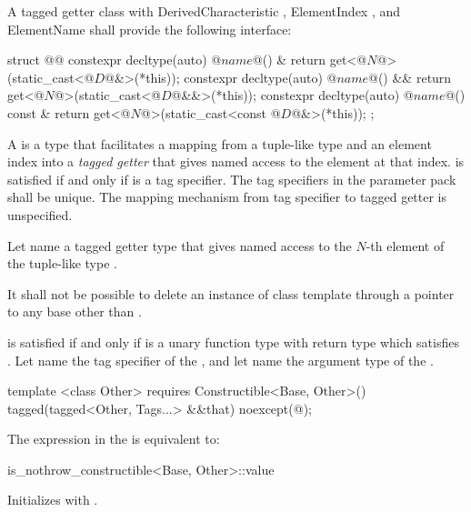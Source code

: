 \pnum A tagged getter class with DerivedCharacteristic , ElementIndex
, and ElementName  shall provide the following interface:

\begin{codeblock}
struct @@ {
  constexpr decltype(auto) @$name$@() &       { return get<@$N$@>(static_cast<@$D$@&>(*this)); }
  constexpr decltype(auto) @$name$@() &&      { return get<@$N$@>(static_cast<@$D$@&&>(*this)); }
  constexpr decltype(auto) @$name$@() const & { return get<@$N$@>(static_cast<const @$D$@&>(*this)); }
};
\end{codeblock}

\pnum
A  is a type that facilitates a mapping from a tuple-like type and an
element index into a \textit{tagged getter} that gives named access to the element at that index.
 is satisfied if and only if  is a tag specifier. The tag specifiers in the
 parameter pack shall be unique. \enternote The mapping mechanism from tag specifier to
tagged getter is unspecified.\exitnote

\pnum Let  name a tagged getter type that gives named
access to the $N$-th element of the tuple-like type .

\pnum It shall not be possible to delete an instance of class template  through a
pointer to any base other than .

\pnum
{} is satisfied if and only if  is a unary function
type with return type  which satisfies . Let
 name the tag specifier of the  , and let
 name the argument type of the  .

\begin{itemdecl}
template <class Other>
  requires Constructible<Base, Other>()
tagged(tagged<Other, Tags...> &&that) noexcept(@\seebelow@);
\end{itemdecl}

\begin{itemdescr}
\pnum
\remarks The expression in the  is equivalent to:

\begin{codeblock}
is_nothrow_constructible<Base, Other>::value
\end{codeblock}

\pnum
\effects Initializes  with .
\end{itemdescr}

